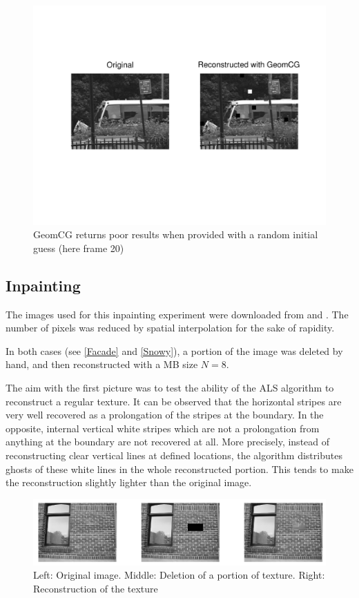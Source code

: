 \documentclass[a4paper, 11pt]{article} %
\begin{document}
\begin{figure}[h!]
\centering
\includegraphics[scale=0.7]{GeomCGRandom}
\caption{GeomCG returns poor results when provided with a random initial guess (here frame 20)\label{GeomCGRandom}}
\end{figure}
 
\subsection{Inpainting}

The images used for this inpainting experiment were downloaded from \cite{facade} and \cite{snow}. The number of pixels was reduced by spatial interpolation for the sake of rapidity. 

In both cases (see \autoref{Facade} and \autoref{Snowy}), a portion of the image was deleted by hand, and then reconstructed with a MB size $N=8$.

The aim with the first picture was to test the ability of the ALS algorithm to reconstruct a regular texture. It can be observed that the horizontal stripes are very well recovered as a prolongation of the stripes at the boundary. In the opposite, internal vertical white stripes which are not a prolongation from anything at the boundary are not recovered at all. More precisely, instead of reconstructing clear vertical lines at defined locations, the algorithm distributes ghosts of these white lines in the whole reconstructed portion. This tends to make the reconstruction slightly lighter than the original image.
\begin{figure}[h!]
\centering
\includegraphics[scale=0.9]{InpaintingFacade}
\caption{Left: Original image. Middle: Deletion of a portion of texture. Right: Reconstruction of the texture\label{Facade}}
\end{figure}
\end{document}
